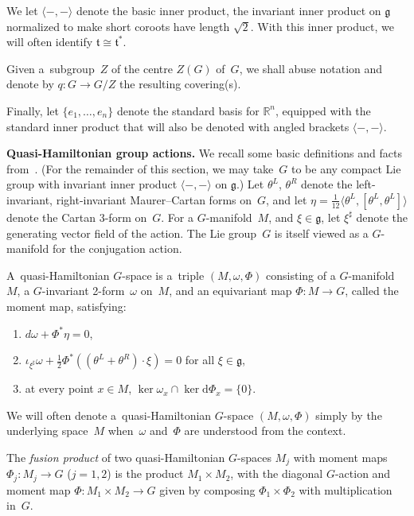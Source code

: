 \documentclass[pdftex]{sigma}
\numberwithin{equation}{section}
\begin{document}
We let $\langle-,-\rangle$ denote the basic inner product, the invariant inner product on $\mathfrak{g}$ normalized to
make short coroots have length $\sqrt{2}$.
With this inner product, we will often identify $\mathfrak{t} \cong \mathfrak{t}^*$.

Given a~subgroup~$Z$ of the centre $Z(G)$ of~$G$, we shall abuse notation and denote by $q:G\to G/Z$ the resulting
covering(s).

Finally, let $\{e_1, \ldots, e_n\}$ denote the standard basis for ${\mathbb{R}}^n$, equipped with the standard inner
product that will also be denoted with angled brackets $\langle -, - \rangle$.

{\bf Quasi-Hamiltonian group actions.}
We recall some basic def\/initions and facts from~\cite{AMM}.
(For the remainder of this section, we may take~$G$ to be any compact Lie group with invariant inner product
$\langle-,-\rangle$ on $\mathfrak{g}$.) Let $\theta^L$, $\theta^R$ denote the left-invariant, right-invariant
Maurer--Cartan forms on~$G$, and let $\eta= \tfrac{1}{12} \langle \theta^L, [\theta^L,\theta^L] \rangle $ denote the
Cartan 3-form on~$G$.
For a $G$-manifold~$M$, and $\xi \in \mathfrak{g}$, let $\xi^\sharp$ denote the generating vector f\/ield of the action.
The Lie group~$G$ is itself viewed as a $G$-manifold for the conjugation action.

\begin{Definition}
\label{def:quasi}
A~quasi-Hamiltonian $G$-space is a~triple $(M,\omega,\Phi)$ consisting of a $G$-manifold $M$,
a $G$-invariant 2-form~$\omega$ on~$M$, and an equivariant map $\Phi\colon M \to G$, called the moment map, satisfying:
\begin{enumerate}\itemsep=0pt
\item[i)] $d\omega + \Phi^* \eta = 0 $,
\item[ii)] $\iota_{\xi^\sharp}\omega +\tfrac{1}{2} \Phi^*((\theta^L + \theta^R) \cdot \xi)=0$ for all $\xi \in \mathfrak{g}$,
\item[iii)] at every point $x\in M$, $\ker \omega_x \cap \ker \mathrm{d} \Phi_x = \{0\}$.
\end{enumerate}
\end{Definition}

We will often denote a~quasi-Hamiltonian $G$-space $(M,\omega,\Phi)$ simply by the underlying space~$M$ when~$\omega$
and~$\Phi$ are understood from the context.

The \emph{fusion product} of two quasi-Hamiltonian $G$-spaces $M_j$ with moment maps $\Phi_j:M_j \to G$ ($j=1,2$) is the
product $M_1\times M_2$, with the diagonal $G$-action and moment map $\Phi:M_1 \times M_2 \to G$ given by composing
$\Phi_1 \times \Phi_2$ with multiplication in~$G$.
\end{document}
